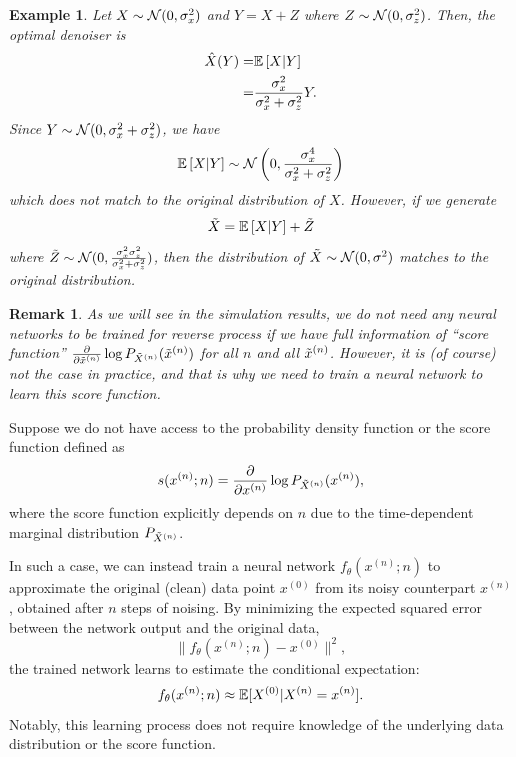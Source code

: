 \documentclass[11pt, a4paper]{article}
\newtheorem{remark}{Remark}
\newtheorem{example}{Example}
\begin{document}
\begin{example}
    Let $X\sim {\cal N}(0, \sigma_x^2)$ and $Y=X+Z$ where $Z\sim{\cal N}(0, \sigma_z^2)$.
    Then, the optimal denoiser is
    \begin{align}
        \hat{X}(Y) =& \Expec{X|Y}\\
        =& \frac{\sigma_x^2}{\sigma_x^2 + \sigma_z^2} Y.
    \end{align}
    Since $Y\sim {\cal N}(0, \sigma_x^2 + \sigma_z^2)$, we have
    \begin{align}
        \Expec{X|Y} \sim \cN\left(0, \frac{\sigma_x^4}{\sigma_x^2+\sigma_z^2}\right)
    \end{align}
    which does not match to the original distribution of $X$.
    However, if we generate
    \begin{align}
        \tilde{X} = \Expec{X|Y} + \tilde{Z}
    \end{align}
    where $\tilde{Z}\sim{\cal N}(0, \frac{\sigma_x^2\sigma_z^2}{\sigma_x^2+\sigma_z^2})$,
    then the distribution of $\tilde{X}\sim{\cal N}(0, \sigma^2)$ matches to the original distribution.
\end{example}

\begin{remark}
    As we will see in the simulation results, we do not need any neural networks to be trained for reverse process
    if we have full information of ``score function'' $\frac{\partial}{\partial \tilde{x}^{(n)}} \log P_{\tilde{X}^{(n)}} (\tilde{x}^{(n)})$ for all $n$ and all $\tilde{x}^{(n)}$.
    However, it is (of course) not the case in practice, and that is why we need to train a neural network to learn this score function.
\end{remark}



Suppose we do not have access to the probability density function or the score function defined as  
\[
s(x^{(n)}; n) = \frac{\partial}{\partial x^{(n)}} \log P_{\tilde{X}^{(n)}} (x^{(n)}),
\]
where the score function explicitly depends on \(n\) due to the time-dependent marginal distribution \(P_{\tilde{X}^{(n)}}\).

In such a case, we can instead train a neural network \(f_\theta(x^{(n)}; n)\) to approximate the original (clean) data point \(x^{(0)}\) from its noisy counterpart \(x^{(n)}\), obtained after \(n\) steps of noising. By minimizing the expected squared error between the network output and the original data,
\[
\|f_\theta(x^{(n)}; n) - x^{(0)}\|^2,
\]
the trained network learns to estimate the conditional expectation:
\[
f_{\theta}(x^{(n)};n) \approx \mathbb{E}[X^{(0)} | X^{(n)} = x^{(n)}].
\]
Notably, this learning process does not require knowledge of the underlying data distribution or the score function.
\end{document}
